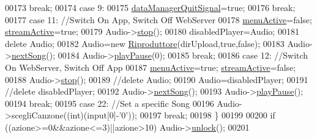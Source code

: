 \begin{DoxyCode}
00173                 \textcolor{keywordflow}{break};
00174             \textcolor{keywordflow}{case} 9:
00175                 \hyperlink{classdataManager_a76b9dba2dde86540f5f37f3b5840653e}{dataManagerQuitSignal}=\textcolor{keyword}{true};
00176                 \textcolor{keywordflow}{break};
00177             \textcolor{keywordflow}{case} 11: \textcolor{comment}{//Switch On App, Switch Off WebServer}
00178                 \hyperlink{classdataManager_a7126a92f131b786ecf68b7a27d58d814}{menuActive}=\textcolor{keyword}{false}; \hyperlink{classdataManager_a73070a3be96596028b91542367e1ebdd}{streamActive}=\textcolor{keyword}{true};
00179                 Audio->\hyperlink{classRiproduttore_a837bea01fa68487694b661ec94781f5d}{stop}();
00180                 disabledPlayer=Audio;
00181                 \textcolor{keyword}{delete} Audio;
00182                 Audio=\textcolor{keyword}{new} \hyperlink{classRiproduttore}{Riproduttore}(dirUpload,\textcolor{keyword}{true},\textcolor{keyword}{false});
00183                 Audio->\hyperlink{classRiproduttore_ab8a211727d84256bc62ab841881ee9c3}{nextSong}();
00184                 Audio->\hyperlink{classRiproduttore_a0e1a448f370d517dbe2ed75f1f097abf}{playPause}(0);
00185                 \textcolor{keywordflow}{break};
00186             \textcolor{keywordflow}{case} 12: \textcolor{comment}{//Switch On WebServer, Switch Off App}
00187                 \hyperlink{classdataManager_a7126a92f131b786ecf68b7a27d58d814}{menuActive}=\textcolor{keyword}{true}; \hyperlink{classdataManager_a73070a3be96596028b91542367e1ebdd}{streamActive}=\textcolor{keyword}{false};
00188                 Audio->\hyperlink{classRiproduttore_a837bea01fa68487694b661ec94781f5d}{stop}();
00189                 \textcolor{comment}{//delete Audio;}
00190                 Audio=disabledPlayer;
00191                 \textcolor{comment}{//delete disabledPlayer;}
00192                 Audio->\hyperlink{classRiproduttore_ab8a211727d84256bc62ab841881ee9c3}{nextSong}();
00193                 Audio->\hyperlink{classRiproduttore_a0e1a448f370d517dbe2ed75f1f097abf}{playPause}();
00194                 \textcolor{keywordflow}{break};
00195             \textcolor{keywordflow}{case} 22: \textcolor{comment}{//Set a specific Song}
00196                 Audio->scegliCanzone((\textcolor{keywordtype}{int})(input[0]-\textcolor{charliteral}{'0'}));
00197                 \textcolor{keywordflow}{break};
00198         \}
00199 
00200         \textcolor{keywordflow}{if} ((azione>=0&&azione<=3)||azione>10) Audio->\hyperlink{classRiproduttore_a58878af288d0625f8971a4b3dab8ccf6}{unlock}();
00201 

\end{DoxyCode}
